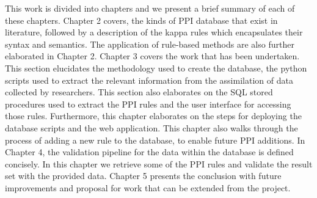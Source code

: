 \documentclass[msc,deptreport,ai]{infthesis}      %
\begin{document}
This work is divided into chapters and we present a brief summary of each of these chapters. Chapter 2 covers, the kinds of PPI database that exist in literature, followed by a description of the kappa rules which encapsulates their syntax and semantics. The application of rule-based methods are also further elaborated in Chapter 2. Chapter 3 covers the work that has been undertaken. This section elucidates the methodology used to create the database, the python scripts used to extract the relevant information from the assimilation of data collected by researchers. This section also elaborates on the SQL stored procedures used to extract the PPI rules and the user interface for accessing those rules. Furthermore, this chapter elaborates on the steps for deploying the database scripts and the web application. This chapter also walks through the process of adding a new rule to the database, to enable future PPI additions. In Chapter 4, the validation pipeline for the data within the database is defined concisely. In this chapter we retrieve some of the PPI rules and validate the result set with the provided data. Chapter 5 presents the conclusion with future improvements and proposal for work that can be extended from the project.


\end{document}
